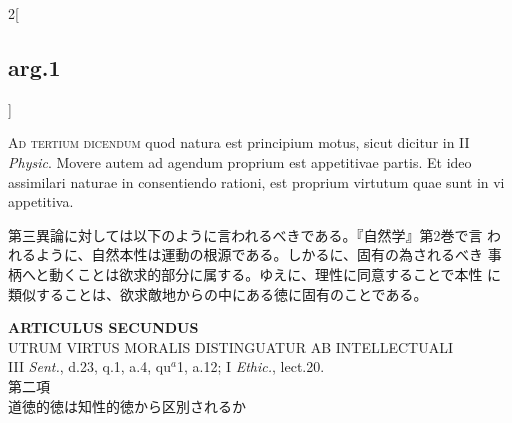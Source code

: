 \documentclass[paper=a4paper,fontsize=10pt,jafontsize=9pt,titlepage]{jlreq}
\begin{document}
\begin{paracol}{2}[\subsection{arg.1}]
\switchcolumn*[\subsection{ad.3}]

{\scshape Ad tertium dicendum} quod natura est principium motus, sicut
dicitur in II {\itshape Physic}. Movere autem ad agendum proprium est
appetitivae partis. Et ideo assimilari naturae in consentiendo
rationi, est proprium virtutum quae sunt in vi appetitiva.

\switchcolumn

第三異論に対しては以下のように言われるべきである。『自然学』第2巻で言
われるように、自然本性は運動の根源である。しかるに、固有の為されるべき
事柄へと動くことは欲求的部分に属する。ゆえに、理性に同意することで本性
に類似することは、欲求敵地からの中にある徳に固有のことである。

\end{paracol}
\newpage
{}
{}
\setcounter{section}{2}
\setcounter{subsection}{0}





\begin{center}
{\Large {\bfseries ARTICULUS SECUNDUS}}\\
{\large UTRUM VIRTUS MORALIS DISTINGUATUR AB INTELLECTUALI}\\
{\footnotesize III {\itshape Sent.}, d.23, q.1, a.4, qu$^{a}$1, a.12; I {\itshape Ethic.}, lect.20.}\\
{\Large 第二項\\道徳的徳は知性的徳から区別されるか}
\end{center}
\end{document}

